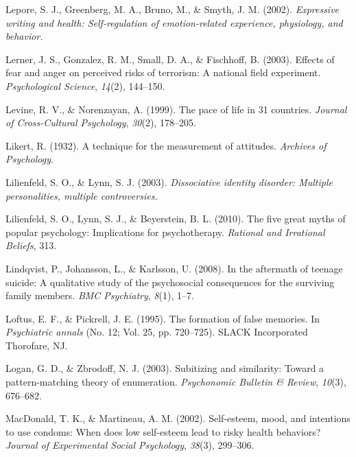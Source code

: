 \documentclass[
]{krantz}
\newlength{\cslhangindent}
\newlength{\cslentryspacingunit} %
\newenvironment{CSLReferences}[2] %
 {%
  \setlength{\parindent}{0pt}
  \ifodd #1
  \let\oldpar\par
  \def\par{\hangindent=\cslhangindent\oldpar}
  \fi
  \setlength{\parskip}{#2\cslentryspacingunit}
 }%
 {}
\begin{document}
\begin{CSLReferences}{1}{0}
\leavevmode{}%
Lepore, S. J., Greenberg, M. A., Bruno, M., \& Smyth, J. M. (2002). \emph{Expressive writing and health: Self-regulation of emotion-related experience, physiology, and behavior.}

\leavevmode{}%
Lerner, J. S., Gonzalez, R. M., Small, D. A., \& Fischhoff, B. (2003). Effects of fear and anger on perceived risks of terrorism: A national field experiment. \emph{Psychological Science}, \emph{14}(2), 144--150.

\leavevmode{}%
Levine, R. V., \& Norenzayan, A. (1999). The pace of life in 31 countries. \emph{Journal of Cross-Cultural Psychology}, \emph{30}(2), 178--205.

\leavevmode{}%
Likert, R. (1932). A technique for the measurement of attitudes. \emph{Archives of Psychology}.

\leavevmode{}%
Lilienfeld, S. O., \& Lynn, S. J. (2003). \emph{Dissociative identity disorder: Multiple personalities, multiple controversies.}

\leavevmode{}%
Lilienfeld, S. O., Lynn, S. J., \& Beyerstein, B. L. (2010). The five great myths of popular psychology: Implications for psychotherapy. \emph{Rational and Irrational Beliefs}, 313.

\leavevmode{}%
Lindqvist, P., Johansson, L., \& Karlsson, U. (2008). In the aftermath of teenage suicide: A qualitative study of the psychosocial consequences for the surviving family members. \emph{BMC Psychiatry}, \emph{8}(1), 1--7.

\leavevmode{}%
Loftus, E. F., \& Pickrell, J. E. (1995). The formation of false memories. In \emph{Psychiatric annals} (No. 12; Vol. 25, pp. 720--725). SLACK Incorporated Thorofare, NJ.

\leavevmode{}%
Logan, G. D., \& Zbrodoff, N. J. (2003). Subitizing and similarity: Toward a pattern-matching theory of enumeration. \emph{Psychonomic Bulletin \& Review}, \emph{10}(3), 676--682.

\leavevmode{}%
MacDonald, T. K., \& Martineau, A. M. (2002). Self-esteem, mood, and intentions to use condoms: When does low self-esteem lead to risky health behaviors? \emph{Journal of Experimental Social Psychology}, \emph{38}(3), 299--306.


\end{CSLReferences}
\end{document}
